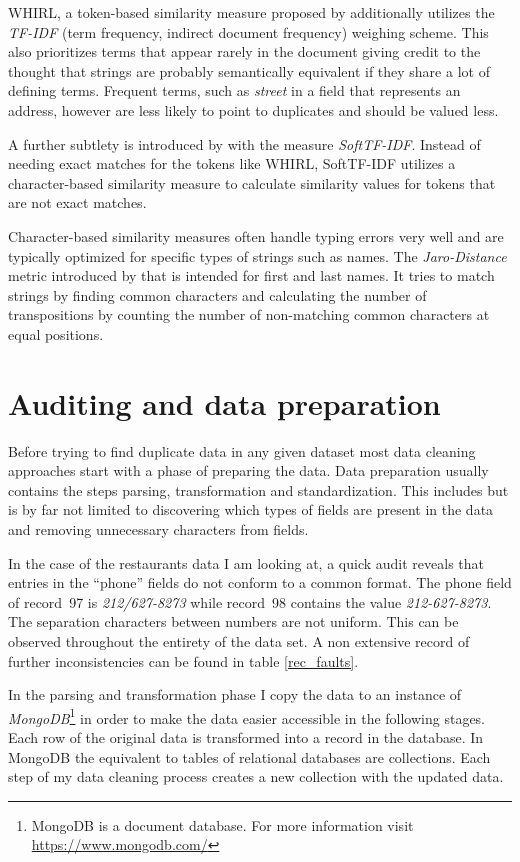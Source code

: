 \documentclass[conference]{IEEEtran}
\begin{document}
WHIRL, a token-based similarity measure proposed by \cite{Cohen.1998} additionally utilizes the \emph{TF-IDF} (term frequency, indirect document frequency) weighing scheme. This also prioritizes terms that appear rarely in the document giving credit to the thought that strings are probably semantically equivalent if they share a lot of defining terms. Frequent terms, such as \emph{street} in a field that represents an address, however are less likely to point to duplicates and should be valued less.

A further subtlety is introduced by \cite{Bilenko.2003} with the measure \emph{SoftTF-IDF}. Instead of needing exact matches for the tokens like WHIRL, SoftTF-IDF utilizes a character-based similarity measure to calculate similarity values for tokens that are not exact matches.

Character-based similarity measures often handle typing errors very well and are typically optimized for specific types of strings such as names. The \emph{Jaro-Distance} metric introduced by \autocite{Jaro.1978} that is intended for first and last names. It tries to match strings by finding common characters and calculating the number of transpositions by counting the number of non-matching common characters at equal positions.

\section{Auditing and data preparation}\label{prep}
Before trying to find duplicate data in any given dataset most data cleaning approaches start with a phase of preparing the data. Data preparation usually contains the steps parsing, transformation and standardization. This includes but is by far not limited to discovering which types of fields are present in the data and removing unnecessary characters from fields. 

In the case of the restaurants data I am looking at, a quick audit reveals that entries in the \enquote{phone} fields do not conform to a common format. The phone field of record~97 is \emph{212/627-8273} while record~98 contains the value \emph{212-627-8273}. The separation characters between numbers are not uniform. This can be observed throughout the entirety of the data set. A non extensive record of further inconsistencies can be found in table \ref{rec_faults}. 

In the parsing and transformation phase I copy the data to an instance of \emph{MongoDB}\footnote{MongoDB is a document database. For more information visit \url{https://www.mongodb.com/}} in order to make the data easier accessible in the following stages. Each row of the original data is transformed into a record in the database. In MongoDB the equivalent to tables of relational databases are collections. Each step of my data cleaning process creates a new collection with the updated data.
\end{document}

